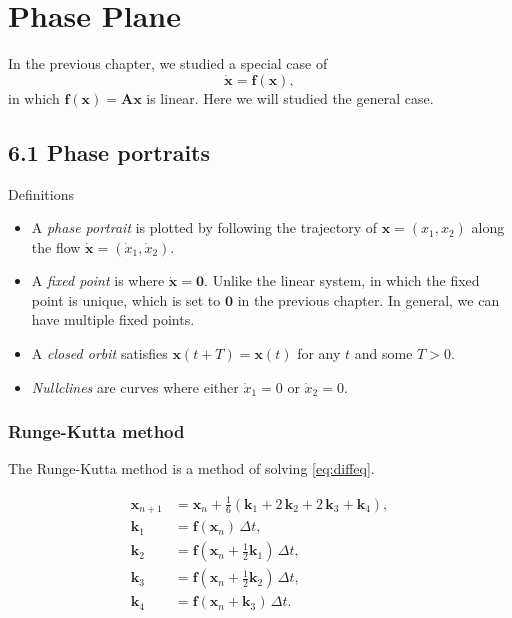 \documentclass{book}
\begin{document}
\chapter{Phase Plane}

In the previous chapter, we studied a special case of
\begin{equation}
  \mathbf{\dot x} = \mathbf f(\mathbf x),
  \label{eq:diffeq}
\end{equation}
in which $\mathbf f(\mathbf x) = \mathbf A \mathbf x$ is linear.
Here we will studied the general case.


\section{6.1 Phase portraits}

Definitions

\begin{itemize}

\item
A \emph{phase portrait} is plotted by following the trajectory of
$\mathbf x = (x_1, x_2)$ along the flow $\mathbf{\dot x} = (\dot x_1, \dot x_2)$.

\item
A \emph{fixed point} is where $\mathbf{\dot x} = \mathbf 0$.
Unlike the linear system, in which the fixed point is unique,
which is set to $\mathbf 0$ in the previous chapter.
In general, we can have multiple fixed points.

\item
A \emph{closed orbit} satisfies $\mathbf x(t + T) = \mathbf x(t)$ for any $t$
and some $T > 0$.

\item
\emph{Nullclines} are curves where either $\dot x_1 = 0$ or $\dot x_2 = 0$.

\end{itemize}



\subsection{Runge-Kutta method}

The Runge-Kutta method is a method of solving \eqref{eq:diffeq}.

$$
\begin{aligned}
\mathbf x_{n+1} &= \mathbf x_n + \frac{1}{6} (\mathbf k_1 + 2 \, \mathbf k_2 + 2 \, \mathbf k_3 + \mathbf k_4), \\
\mathbf k_1 &= \mathbf f(\mathbf x_n) \, \Delta t, \\
\mathbf k_2 &= \mathbf f(\mathbf x_n + \frac 1 2 \mathbf k_1) \, \Delta t, \\
\mathbf k_3 &= \mathbf f(\mathbf x_n + \frac 1 2 \mathbf k_2) \, \Delta t, \\
\mathbf k_4 &= \mathbf f(\mathbf x_n + \mathbf k_3) \, \Delta t.
\end{aligned}
$$
\end{document}
